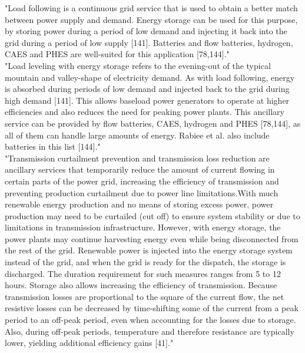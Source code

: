 "Load following is a continuous grid service that is used to obtain a better match between power supply and demand. Energy storage can be used for this purpose, by storing power during a period of low demand and injecting it back into the grid during a period of low supply [141]. Batteries and flow batteries, hydrogen, CAES and PHES are well-suited for this application [78,144]." \\
"Load leveling with energy storage refers to the evening-out of the typical mountain and valley-shape of electricity demand. As with load following, energy is absorbed during periods of low demand and injected back to the grid during high demand [141]. This allows baseload power generators to operate at higher efficiencies and also reduces the need for peaking power plants. This ancillary service can be provided by flow batteries, CAES, hydrogen and PHES [78,144], as all of them can handle large amounts of energy. Rabiee et al. also include batteries in this list [144]." \\
"Transmission curtailment prevention and transmission loss reduction are ancillary services that temporarily reduce the amount of current flowing in certain parts of the power grid, increasing the efficiency of transmission and preventing production curtailment due to power line limitations.With much renewable energy production and no means of storing excess power, power production may need to be curtailed (cut off) to ensure system stability or due to limitations in transmission infrastructure. However, with energy storage, the power plants may continue harvesting energy even while being disconnected from the rest of the grid. Renewable power is injected into the energy storage system instead of the grid, and when the grid is ready for the dispatch, the storage is discharged. The duration requirement for such measures ranges from 5 to 12 hours. Storage also allows increasing the efficiency of transmission. Because transmission losses are proportional to the square of the current flow, the net resistive losses can be decreased by time-shifting some of the current from a peak period to an off-peak period, even when accounting for the losses due to storage. Also, during off-peak periods, temperature and therefore resistance are typically lower, yielding additional efficiency gains [41]." \cite{lund_review_2015}





